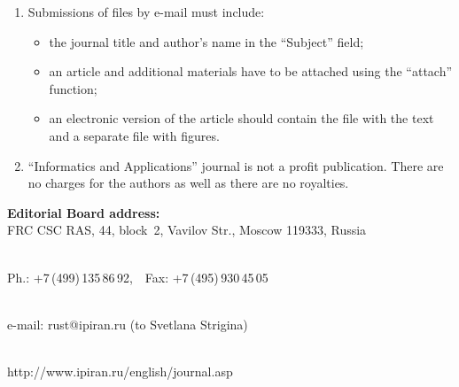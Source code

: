 {\begin{enumerate}[1.]
\item Submissions of files by e-mail must include:\\[-13.5pt]
\begin{itemize}
\item   the journal title and author's name in the ``Subject'' field; \\[-13.5pt]
\item   an article and additional materials have to be attached using the ``attach'' function;\\[-13.5pt]
\item   an electronic version of the article should contain the file with the text and a separate file
with figures.\\[-13.5pt]
\end{itemize}

\item ``Informatics and Applications'' journal is not a profit publication. There are no
charges for the authors as well as there are no royalties.\\[-13.5pt]
\end{enumerate}

\def\leftfootline{\small{\textbf{\thepage}
\hfill INFORMATIKA I EE PRIMENENIYA~--- INFORMATICS AND APPLICATIONS\ \ \ 2020\
\ \ volume~14\ \ \ issue\ 2}
}%
 \def\rightfootline{\small{INFORMATIKA I EE PRIMENENIYA~--- INFORMATICS AND APPLICATIONS\ \ \ 2020\ \ \ volume~14\ \ \ issue\ 2
\hfill \textbf{\thepage}}}

\def\leftkol{Requirements for manuscripts submitted to Journal
``Informatics~and~Applications''}

\def\rightkol{Requirements for manuscripts submitted to Journal
``Informatics~and~Applications''}




\begin{center}
\textbf{Editorial Board address:} \\




FRC CSC RAS, 44, block~2, Vavilov Str., Moscow 119333, Russia\\[-10pt]

\

Ph.: +7\,(499)\,135\,86\,92,\ \ Fax: +7\,(495)\,930\,45\,05\\[-10pt]

\

 e-mail: {\sf rust@ipiran.ru} (to Svetlana Strigina)\\[-10pt]

\

 {\sf http://www.ipiran.ru/english/journal.asp}
\end{center}
 }

